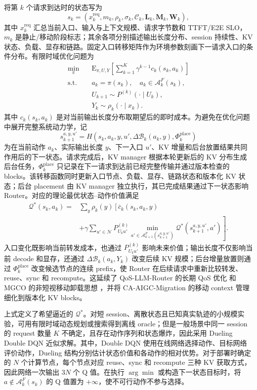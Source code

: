 将第 \(k\) 个请求到达时的状态写为
\[
s_k=
(x_k^{\mathrm{req}},m_k,\rho_k,\sigma_k,\mathcal C_k,
\mathbf L_k,\mathbf M_k,\mathbf W_k),
\]
其中 \(x_k^{\mathrm{req}}\) 汇总当前入口、输入与上下文规模、请求字节数和 TTFT/E2E SLO，\(m_k\) 是静止/移动阶段标志；其余各项分别描述输出长度分布、session 持续性、KV 状态、负载、显存和链路。固定入口转移矩阵作为环境参数刻画下一请求入口的条件分布。有限时域优化问题为
\[
\begin{array}{ll}
\displaystyle\min_{\pi}\quad&
\displaystyle
\mathrm E_{\pi,U,Y}
\left[\sum_{k=1}^{K}\gamma^{k-1}c_k(s_k,a_k)\right]\\
\mathrm{s.t.}\quad&
a_k=\pi(s_k),\quad a_k\in\mathcal A_k^F(s_k),\\
&U_{k+1}\sim P^{(k)}(\cdot\mid U_k),\\
&Y_k\sim\rho_k(\cdot\mid x_k).
\end{array}
\]
其中 \(c_k(s_k,a_k)\) 是对当前输出长度分布取期望后的即时成本。为避免在优化问题中展开完整系统动力学，记
\[
s_{k+1}^{a,y,u'}
=
H(s_k,a_k,y,u',\Delta\mathcal B_k(a_k,y),
\Phi_k^{\mathrm{place}})
\]
为在当前动作 \(a_k\)、实际输出长度 \(y\)、下一入口 \(u'\)、KV 增量和后台放置结果共同作用后的下一状态。请求完成后，KV manager 根据本轮更新后的 KV 分布生成后台任务，\(\Phi_k^{\mathrm{place}}\) 只记录在下一请求到达前已经完整传输并通过版本检查的 blocks。该转移函数同时更新入口节点、负载、显存、链路状态和版本化 KV 状态；后台 placement 由 KV manager 独立执行，其已完成结果通过下一状态影响 Router。对应的理论最优状态--动作价值满足
\[
\begin{array}{rl}
\mathcal Q^*(s_k,a_k)
={}&\displaystyle
\sum_y\rho_k(y)
\left[
\bar c_k(s_k,a_k,y)\right.\\
&\displaystyle\left.
+\gamma
\sum_{u'\in\mathcal N}
 P_{U_ku'}^{(k)}
\min_{a'\in\mathcal A_{k+1}^F(s_{k+1}^{a,y,u'})}
\mathcal Q^*(s_{k+1}^{a,y,u'},a')
\right].
\end{array}
\]
入口变化既影响当前转发成本，也通过 \(P_{U_ku'}^{(k)}\) 影响未来价值；输出长度不仅影响当前 decode 和显存，还通过 \(\Delta\mathcal B_k(a_k,Y_k)\) 改变后续 KV 规模；后台增量放置则通过 \(\Phi_k^{\mathrm{place}}\) 改变候选节点的连续 prefix，使 Router 在后续请求中重新比较转发、reuse、sync 和 recompute。这延续了 QoS-LLM-Router 的长期 QoS 优化 \cite{yang2025quality} 和 MGCO 的非短视移动卸载思想 \cite{ghosh2025mgco}，并将 CA-AIGC-Migration 的移动 context 管理 \cite{wang2026context} 细化到版本化 KV blocks。

上式定义了希望逼近的 \(\mathcal Q^*\)。对短 session、离散状态且已知真实轨迹的小规模实验，可用有限时域动态规划或搜索得到离线 oracle；但是一般场景中同一 session 的 request 数量 \(K\) 不确定，且存在动作序列和状态爆炸，因此采用 Dueling Double DQN 近似求解。其中，Double DQN 使用在线网络选择动作、目标网络评价动作，Dueling 结构分别估计状态价值和各动作的相对优势。对于部署时确定的 \(N\) 个计算节点，每个节点对应 reuse、sync 和 recompute 三种 KV 获取方式，因此网络一次输出 \(3N\) 个 Q 值。在执行 \(\arg\min\) 或构造下一状态目标时，将 \(a\notin\mathcal A_k^F(s_k)\) 的 Q 值置为 \(+\infty\)，使不可行动作不参与选择。

